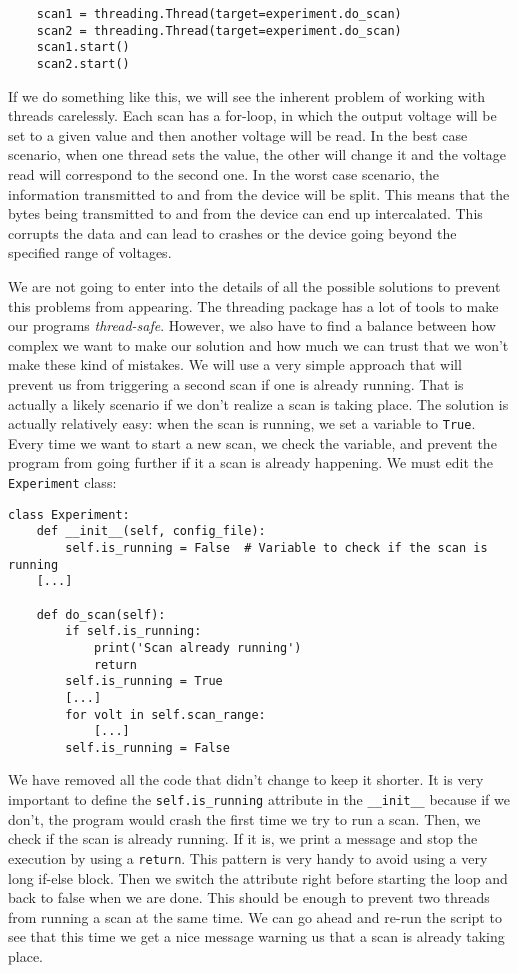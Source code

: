 \begin{verbatim}
    scan1 = threading.Thread(target=experiment.do_scan)
    scan2 = threading.Thread(target=experiment.do_scan)
    scan1.start()
    scan2.start()
\end{verbatim}

If we do something like this, we will see the inherent problem of working with threads carelessly. Each scan has a for-loop, in which the output voltage will be set to a given value and then another voltage will be read. In the best case scenario, when one thread sets the value, the other will change it and the voltage read will correspond to the second one. In the worst case scenario, the information transmitted to and from the device will be split. This means that the bytes being transmitted to and from the device can end up intercalated. This corrupts the data and can lead to crashes or the device going beyond the specified range of voltages.

We are not going to enter into the details of all the possible solutions to prevent this problems from appearing. The threading package has a lot of tools to make our programs \emph{thread-safe}. However, we also have to find a balance between how complex we want to make our solution and how much we can trust that we won't make these kind of mistakes. We will use a very simple approach that will prevent us from triggering a second scan if one is already running. That is actually a likely scenario if we don't realize a scan is taking place. The solution is actually relatively easy: when the scan is running, we set a variable to \texttt{True}. Every time we want to start a new scan, we check the variable, and prevent the program from going further if it a scan is already happening. We must edit the \texttt{Experiment} class:

\begin{verbatim}
class Experiment:
    def __init__(self, config_file):
        self.is_running = False  # Variable to check if the scan is running
    [...]

    def do_scan(self):
        if self.is_running:
            print('Scan already running')
            return
        self.is_running = True
        [...]
        for volt in self.scan_range:
            [...]
        self.is_running = False
\end{verbatim}

We have removed all the code that didn't change to keep it shorter. It is very important to define the \texttt{self.is\_running} attribute in the \texttt{\_\_init\_\_} because if we don't, the program would crash the first time we try to run a scan. Then, we check if the scan is already running. If it is, we print a message and stop the execution by using a \texttt{return}. This pattern is very handy to avoid using a very long if-else block. Then we switch the attribute right before starting the loop and back to false when we are done. This should be enough to prevent two threads from running a scan at the same time. We can go ahead and re-run the script to see that this time we get a nice message warning us that a scan is already taking place.

